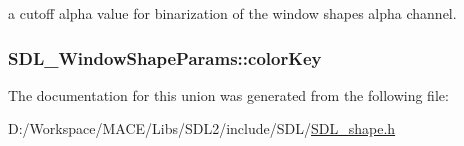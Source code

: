 a cutoff alpha value for binarization of the window shape\textquotesingle{}s alpha channel. 

\subsubsection[{\texorpdfstring{color\+Key}{colorKey}}]{ S\+D\+L\+\_\+\+Window\+Shape\+Params\+::color\+Key}\hypertarget{union_s_d_l___window_shape_params_a8bf3e442a51a1bbf452cfec7c1ed5318}{}\label{union_s_d_l___window_shape_params_a8bf3e442a51a1bbf452cfec7c1ed5318}


The documentation for this union was generated from the following file\+:\begin{DoxyCompactItemize}
\item 
D\+:/\+Workspace/\+M\+A\+C\+E/\+Libs/\+S\+D\+L2/include/\+S\+D\+L/\hyperlink{_s_d_l__shape_8h}{S\+D\+L\+\_\+shape.\+h}\end{DoxyCompactItemize}
